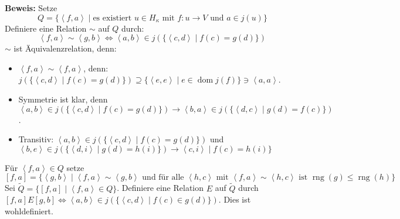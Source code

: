 \documentclass[a4paper,fontsize=11pt]{scrartcl}
\newcommand{\rng}{\operatorname{rng}}
\newcommand{\dom}{\operatorname{dom}}
\begin{document}
{\bf Beweis:} Setze $$Q = \{\left<f, a\right>\mid \mbox{es existiert }u\in H_\kappa\mbox{ mit }f:u\rightarrow V\mbox{ und }a\in j(u)\}$$ Definiere
eine Relation $\sim$ auf $Q$ durch: $$ \left<f, a\right>\sim\left<g,b\right> \Leftrightarrow \left<a,b\right>\in j(\{\left<c,d\right>\mid
f(c)=g(d)\}) $$ $\sim$ ist Äquivalenzrelation, denn:
\begin{itemize}
  \item $\left<f,a\right>\sim\left<f,a\right>$, denn: $j(\{\left<c,d\right>\mid f(c)=g(d)\})\supseteq\{\left<e,e\right>\mid e\in\dom
    j(f)\}\ni\left<a,a\right>$.
  \item Symmetrie ist klar, denn $\left<a,b\right>\in j(\{\left<c,d\right>\mid f(c) = g(d)\}) \rightarrow \left<b,a\right>\in j(\{\left<d,c\right>\mid
    g(d)=f(c)\})$.
  \item Transitiv: $\left<a,b\right>\in j(\{\left<c,d\right>\mid f(c)=g(d)\})$ und $\left<b, e\right>\in j(\{\left<d,i\right>\mid
    g(d)=h(i)\})\rightarrow \left<c,i\right>\mid f(c) = h(i)\}$
\end{itemize}
Für $\left<f,a\right>\in Q$ setze $$ [f,a] = \{ \left<g, b\right> \mid \left<f, a\right>\sim\left<g,b\right> \mbox{ und für alle } \left<h,c\right>
\mbox{ mit } \left<f,a\right>\sim\left<h,c\right> \mbox{ ist } \rng(g)\le\rng(h)\} $$ Sei $\tilde{Q} = \{[f,a]\mid\left<f,a\right>\in Q\}$. Definiere
eine Relation $E$ auf $\tilde{Q}$ durch $[f,a] E [g,b] \Leftrightarrow \left<a,b\right>\in j(\{\left<c,d\right>\mid f(c)\in g(d)\})$. Dies ist
wohldefiniert.
\end{document}
